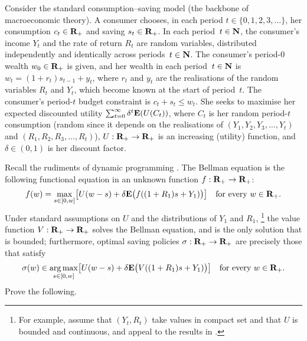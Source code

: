 \begin{exercise}
	\label{exercise:consumption-saving}
	Consider the standard consumption--saving model (the backbone of macroeconomic theory). A consumer chooses, in each period $t \in \{0,1,2,3,\dots\}$, her consumption $c_t \in \mathbf{R}_+$ and saving $s_t \in \mathbf{R}_+$. In each period~$t \in \mathbf{N}$, the consumer's income $Y_t$ and the rate of return $R_t$ are random variables, distributed independently and identically across periods~$t \in \mathbf{N}$. The consumer's period-$0$ wealth $w_0 \in \mathbf{R}_+$ is given, and her wealth in each period~$t \in \mathbf{N}$ is $w_t = (1+r_t) s_{t-1} + y_t$, where $r_t$ and $y_t$ are the realisations of the random variables $R_t$ and $Y_t$, which become known at the start of period~$t$. The consumer's period-$t$ budget constraint is $c_t + s_t \leq w_t$. She seeks to maximise her expected discounted utility $\sum_{t=0}^\infty \delta^t \mathbf{E}(U(C_t))$, where $C_t$ is her random period-$t$ consumption (random since it depends on the realisations of $(Y_1,Y_2,Y_3,\dots,Y_t)$ and $(R_1,R_2,R_3,\dots,R_t)$), $U : \mathbf{R}_+ \to \mathbf{R}_+$ is an increasing (utility) function, and $\delta \in (0,1)$ is her discount factor.

	Recall the rudiments of dynamic programming \parencite[e.g.][]{StokeyLucasPrescott1989}. The Bellman equation is the following functional equation in an unknown function $f : \mathbf{R}_+ \to \mathbf{R}_+$:
	\begin{equation*}
		f(w) =
		\max_{s \in [0,w]}
		\left[ U(w-s) + \delta \E\bigl( f\left( (1+R_1) s + Y_1 \right) \bigr) \right]
		\quad \text{for every $w \in \R_+$.}
	\end{equation*}
	Under standard assumptions on $U$ and the distributions of $Y_1$ and $R_1$,%
		\footnote{For example, assume that $(Y_t,R_t)$ take values in compact set and that $U$ is bounded and continuous, and appeal to the results in \textcite[][chapter~9]{StokeyLucasPrescott1989}.}
	the value function $V : \mathbf{R}_+ \to \mathbf{R}_+$ solves the Bellman equation, and is the only solution that is bounded; furthermore, optimal saving policies $\sigma : \mathbf{R}_+ \to \mathbf{R}_+$ are precisely those that satisfy
	\begin{equation*}
		\sigma(w) \in \argmax_{s \in [0,w]}
		\left[ U(w-s) + \delta \E\bigl( V\left( (1+R_1) s + Y_1 \right) \bigr) \right] 
		\quad \text{for every $w \in \R_+$.}
	\end{equation*}
	Prove the following.

	\begin{enumerate}[label=(\alph*)]
	

\end{enumerate}
\end{exercise}

